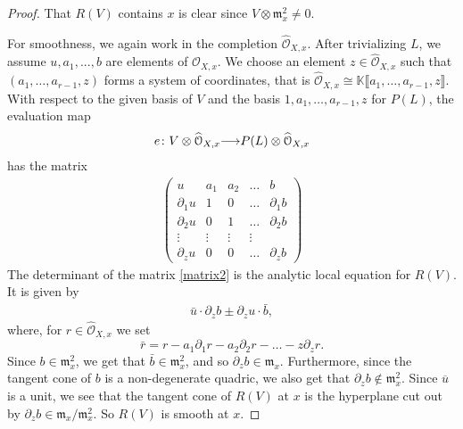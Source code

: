 \documentclass[11pt,reqno]{amsart}
\theoremstyle{plain}
\theoremstyle{definition}
\theoremstyle{remark}
\numberwithin{equation}{section}
\renewcommand{\k}{\mathbb{K}}
\renewcommand{\to}{{\longrightarrow}}
\numberwithin{equation}{section}
\renewcommand{\O}{\mathcal O}
\begin{document}
\begin{proof}
  That $R(V)$ contains $x$ is clear since $V \otimes \mathfrak{m}^{2}_{x} \neq 0$.

  For smoothness, we again work in the completion $\widehat{\O}_{X,x}$.
  After trivializing $L$, we assume $u, a_{1}, ..., b$ are elements of $\widehat{\O}_{X,x}$.
  We choose an element $z \in \widehat{\O}_{X,x}$ such that $(a_1, \dots, a_{r-1}, z)$ forms a system of coordinates, that is $\widehat{\O}_{X,x} \cong \k\llbracket a_{1}, \dots , a_{r-1}, z \rrbracket$.
  With respect to the given basis of $V$ and the basis $1, a_1, \dots, a_{r-1}, z$ for $P(L)$, the evaluation map
  \begin{align*}
  e\from V \otimes \widehat{\O}_{X,x} \to P(L) \otimes \widehat{\O}_{X,x}
  \end{align*}
  has the matrix
\begin{align}\label{matrix2}
\begin{pmatrix}
  u & a_{1} & a_{2} & \dots & b \\
  \partial_{1}u & 1 & 0 & \dots & \partial_{1}b \\
  \partial_{2}u & 0 & 1 & \dots & \partial_{2}b \\
  \vdots & \vdots & \vdots & \vdots \\
  \partial_{z}u  & 0 & 0 & \dots & \partial_{z}b
\end{pmatrix}
\end{align}
The determinant of the matrix \eqref{matrix2} is the analytic local equation for $R(V)$.
It is given by
\begin{align*}
   \bar{u} \cdot \partial_{z}b \pm \partial_{z}u \cdot \bar{b},
 \end{align*} 
 where, for $r \in \widehat{\O}_{X,x}$ we set
 \[\bar{r} = r - a_{1}\partial_{1}r - a_{2}\partial_{2}r - \dots - z \partial_{z} r.\]
 Since $b \in {\mathfrak m}^{2}_{x}$, we get that $\bar{b} \in {\mathfrak m}^{2}_{x}$, and so $\partial_{z}b \in {\mathfrak m}_{x}$.
 Furthermore, since the tangent cone of $b$ is a non-degenerate quadric, we also get that $\partial_z b \not \in \mathfrak m_x^2$.
 Since $\overline{u}$ is a unit, we see that the tangent cone of $R(V)$ at $x$ is the hyperplane cut out by $\partial_z b \in \mathfrak m_x/\mathfrak m_x^2$.
 So $R(V)$ is smooth at $x$.
\end{proof}
\end{document}
